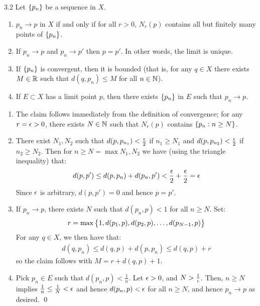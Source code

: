 \setcounter{rudin}{1}
\begin{theorem}{}{3.2}
    Let $\set{p_n}$ be a sequence in $X$.
    \begin{enumerate}
        \item $p_n \rightarrow p$ in $X$ if and only if for all $r > 0$, $N_r(p)$ contains all but finitely many points of $\set{p_n}$.
        \item If $p_n \rightarrow p$ and $p_n \rightarrow p'$ then $p = p'$. In other words, the limit is unique.
        \item If $\set{p_n}$ is convergent, then it is bounded (that is, for any $q \in X$ there exists $M \in \mathbb{R}$ such that $d(q, p_n) \leq M$ for all $n \in \mathbb{N}$).
        \item If $E \subset X$ has a limit point $p$, then there exists $\set{p_n}$ in $E$ such that $p_n \rightarrow p$. 
    \end{enumerate}
\end{theorem}
\begin{nproof}
    \begin{enumerate}
        \item The claim follows immediately from the definition of convergence; for any $r = \epsilon > 0$, there exists $N \in \mathbb{N}$ such that $N_r(p)$ contains $\set{p_n: n \geq N}$.
        \item There exist $N_1, N_2$ such that $d(p, p_{n_1}) < \frac{\epsilon}{2}$ if $n_1 \geq N_1$ and $d(p, p_{n_2}) < \frac{\epsilon}{2}$ if $n_2 \geq N_2$. Then for $n \geq N = \max{N_1, N_2}$ we have (using the triangle inequality) that:
        \begin{align*}
            d(p, p') \leq d(p, p_n) + d(p_n, p') < \frac{\epsilon}{2} + \frac{\epsilon}{2} = \epsilon
        \end{align*}
        Since $\epsilon$ is arbitrary, $d(p, p') = 0$ and hence $p = p'$.

        \item If $p_n \rightarrow p$, there exists $N$ such that $d(p_n, p) < 1$ for all $n \geq N$. Set:
        \begin{align*}
            r = \max\set{1, d(p_1, p), d(p_2, p), \ldots ,d(p_{N-1}, p)}
        \end{align*}
        For any $q \in X$, we then have that:
        \begin{align*}
            d(q, p_n) \leq d(q, p) + d(p, p_n) \leq d(q, p) + r
        \end{align*}
        so the claim follows with $M = r + d(q, p) + 1$.
        \item Pick $p_n \in E$ such that $d(p_n, p) < \frac{1}{n}$. Let $\epsilon > 0$, and $N > \frac{1}{\epsilon}$. Then, $n \geq N$ implies $\frac{1}{n} \leq \frac{1}{N} < \epsilon$ and hence $d(p_n, p) < \epsilon$ for all $n \geq N$, and hence $p_n \rightarrow p$ as desired. \qed
    \end{enumerate}
\end{nproof}

